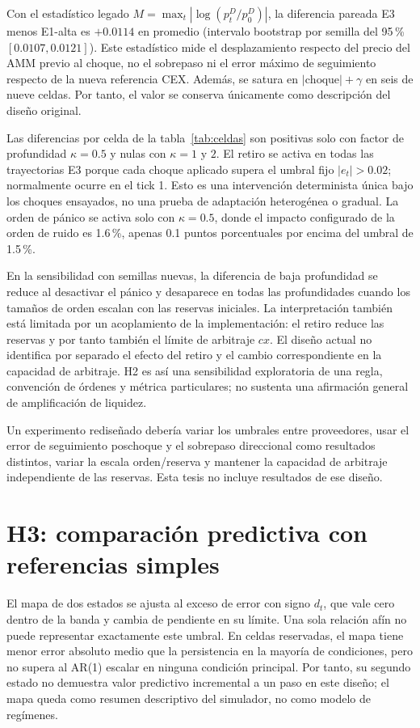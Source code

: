 Con el estadístico legado $M=\max_t|\log(p_t^D/p_0^D)|$, la diferencia pareada E3 menos E1-alta es $+0.0114$ en promedio (intervalo bootstrap por semilla del 95\,\% $[0.0107,0.0121]$). Este estadístico mide el desplazamiento respecto del precio del AMM previo al choque, no el sobrepaso ni el error máximo de seguimiento respecto de la nueva referencia CEX. Además, se satura en $|\text{choque}|+\gamma$ en seis de nueve celdas. Por tanto, el valor se conserva únicamente como descripción del diseño original.

Las diferencias por celda de la tabla~\ref{tab:celdas} son positivas solo con factor de profundidad $\kappa=0.5$ y nulas con $\kappa=1$ y $2$. El retiro se activa en todas las trayectorias E3 porque cada choque aplicado supera el umbral fijo $|e_t|>0.02$; normalmente ocurre en el tick 1. Esto es una intervención determinista única bajo los choques ensayados, no una prueba de adaptación heterogénea o gradual. La orden de pánico se activa solo con $\kappa=0.5$, donde el impacto configurado de la orden de ruido es 1.6\,\%, apenas 0.1 puntos porcentuales por encima del umbral de 1.5\,\%.

En la sensibilidad con semillas nuevas, la diferencia de baja profundidad se reduce al desactivar el pánico y desaparece en todas las profundidades cuando los tamaños de orden escalan con las reservas iniciales. La interpretación también está limitada por un acoplamiento de la implementación: el retiro reduce las reservas y por tanto también el límite de arbitraje $c x$. El diseño actual no identifica por separado el efecto del retiro y el cambio correspondiente en la capacidad de arbitraje. H2 es así una sensibilidad exploratoria de una regla, convención de órdenes y métrica particulares; no sustenta una afirmación general de amplificación de liquidez.

Un experimento rediseñado debería variar los umbrales entre proveedores, usar el error de seguimiento poschoque y el sobrepaso direccional como resultados distintos, variar la escala orden/reserva y mantener la capacidad de arbitraje independiente de las reservas. Esta tesis no incluye resultados de ese diseño.

\section{H3: comparación predictiva con referencias simples}
\label{sec:res-h3}

El mapa de dos estados se ajusta al exceso de error con signo $d_t$, que vale cero dentro de la banda y cambia de pendiente en su límite. Una sola relación afín no puede representar exactamente este umbral. En celdas reservadas, el mapa tiene menor error absoluto medio que la persistencia en la mayoría de condiciones, pero no supera al AR(1) escalar en ninguna condición principal. Por tanto, su segundo estado no demuestra valor predictivo incremental a un paso en este diseño; el mapa queda como resumen descriptivo del simulador, no como modelo de regímenes.

